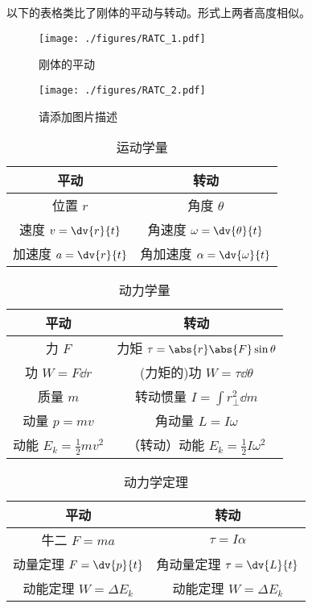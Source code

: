 
以下的表格类比了刚体的平动与转动。形式上两者高度相似。
\begin{figure}[ht]
\centering
\texttt{[image: ./figures/RATC\_1.pdf]}
\caption{刚体的平动} \label{RATC_fig1}
\end{figure}

\begin{figure}[ht]
\centering
\texttt{[image: ./figures/RATC\_2.pdf]}
\caption{请添加图片描述} \label{RATC_fig2}
\end{figure}

\begin{table}[ht]
\centering
\caption{运动学量}\label{RATC_tab1}
\begin{tabular}{|c|c|}
\hline
平动&转动\\
\hline
位置 $r$ & 角度 $\theta$ \\
\hline
速度 $v=\dv{r}{t}$ & 角速度 $\omega = \dv{\theta}{t}$ \\
\hline
加速度 $a = \dv{r}{t}$ & 角加速度 $\alpha = \dv{\omega}{t}$ \\
\hline
\end{tabular}
\end{table}

\begin{table}[ht]
\centering
\caption{动力学量}\label{RATC_tab2}
\begin{tabular}{|c|c|}
\hline
平动&转动\\
\hline
力 $F$ & 力矩 $\tau=\abs{r}\abs{F} \sin \theta$\\
\hline 
功 $W = F \dd r$ & (力矩的)功 $W=\tau \dd \theta$\\
\hline
质量 $m$ & 转动惯量 $I = \int r_\perp^2 \dd m$ \\
\hline
动量 $p=mv$ & 角动量 $L=I\omega$ \\
\hline
动能 $E_k = \frac{1}{2}mv^2$ & （转动）动能 $E_k = \frac{1}{2} I\omega^2$ \\
\hline
\end{tabular}
\end{table}

\begin{table}[ht]
\centering
\caption{动力学定理}\label{RATC_tab3}
\begin{tabular}{|c|c|}
\hline
平动&转动\\
\hline 
牛二 $F=ma$& $\tau = I \alpha$\\
\hline
动量定理 $F=\dv{p}{t}$ & 角动量定理 $\tau=\dv{L}{t}$ \\
\hline
动能定理 $W = \Delta E_k$ & 动能定理 $W = \Delta E_k$ \\
\hline
\end{tabular}
\end{table}
